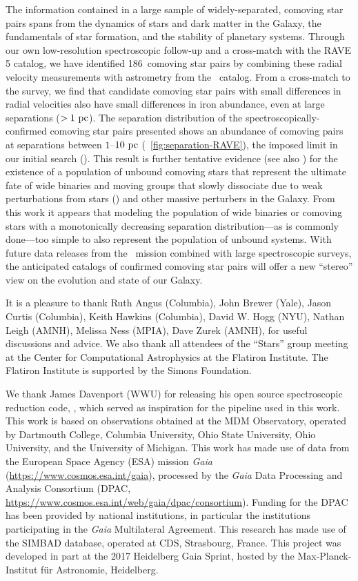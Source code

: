 \documentclass[modern, letterpaper]{aastex61}
\newcommand{\gaia}{\project{Gaia}}
\newcommand{\DR}[1]{\acronym{DR}#1}
\newcommand{\tgas}{\acronym{TGAS}}
\newcommand{\ncomovingtotal}{186}
\begin{document}
The information contained in a large sample of widely-separated, comoving star
pairs spans from the dynamics of stars and dark matter in the Galaxy, the
fundamentals of star formation, and the stability of planetary systems.
Through our own low-resolution spectroscopic follow-up and a cross-match with
the RAVE \DR{5} catalog, we have identified \ncomovingtotal\ comoving star pairs
by combining these radial velocity measurements with astrometry from the \tgas\
catalog.
From a cross-match to the  survey, we find that candidate
comoving star pairs with small differences in radial velocities also have small
differences in iron abundance, even at large separations ($>1~\mathrm{pc}$).
The separation distribution of the spectroscopically-confirmed comoving star
pairs presented shows an abundance of comoving pairs at separations between
$1$--$10~\mathrm{pc}$ (\figurename~\ref{fig:separation-RAVE}), the imposed limit in our
initial search (\citealt{Oh:2017}).
This result is further tentative evidence (see also \citealt{Shaya:2011}) for
the existence of a population of unbound comoving stars that represent the
ultimate fate of wide binaries and moving groups that slowly dissociate due to
weak perturbations from stars (\citealt{Jiang:2010}) and other massive
perturbers in the Galaxy.
From this work it appears that modeling the population of wide binaries or
comoving stars with a monotonically decreasing separation distribution---as is commonly done---too simple to also represent the population of unbound systems.
With future data releases from the \gaia\ mission combined with large
spectroscopic surveys, the anticipated catalogs of confirmed comoving star pairs
will offer a new ``stereo'' view on the evolution and state of our Galaxy.

\acknowledgements

It is a pleasure to thank
Ruth Angus (Columbia),
John Brewer (Yale),
Jason Curtis (Columbia),
Keith Hawkins (Columbia),
David W. Hogg (NYU),
Nathan Leigh (AMNH),
Melissa Ness (MPIA),
Dave Zurek (AMNH),
for useful discussions and advice.
We also thank all attendees of the ``Stars'' group meeting at the Center for
Computational Astrophysics at the Flatiron Institute.
The Flatiron Institute is supported by the Simons Foundation.

We thank James Davenport (WWU) for releasing his open source spectroscopic
reduction code, \package{PyDIS}, which served as inspiration for the pipeline
used in this work.
This work is based on observations obtained at the MDM Observatory, operated by
Dartmouth College, Columbia University, Ohio State University, Ohio University,
and the University of Michigan.
This work has made use of data from the European Space Agency (ESA)
mission {\it Gaia} (\url{https://www.cosmos.esa.int/gaia}), processed by
the {\it Gaia} Data Processing and Analysis Consortium (DPAC,
\url{https://www.cosmos.esa.int/web/gaia/dpac/consortium}). Funding
for the DPAC has been provided by national institutions, in particular
the institutions participating in the {\it Gaia} Multilateral Agreement.
This research has made use of the SIMBAD database, operated at CDS, Strasbourg,
France.
This project was developed in part at the 2017 Heidelberg Gaia Sprint, hosted by
the Max-Planck-Institut f\"ur Astronomie, Heidelberg.
\end{document}
